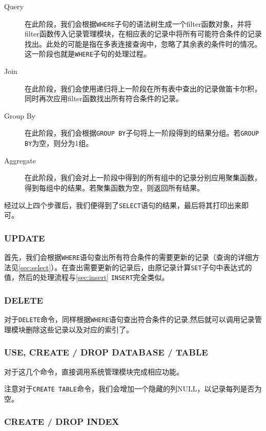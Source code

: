 \documentclass[11pt, a4paper]{article}
\begin{document}
\begin{description}
\item[Query] 在此阶段，我们会根据\texttt{WHERE}子句的语法树生成一个filter函数对象，并将filter函数传入记录管理模块，在相应表的记录中将所有可能符合条件的记录找出。此处的可能是指在多表连接查询中，忽略了其余表的条件时的情况。这一阶段也就是\texttt{WHERE}子句的处理过程。
\item[Join] 在此阶段，我们会使用递归将上一阶段在所有表中查出的记录做笛卡尔积，同时再次应用filter函数找出所有符合条件的记录。
\item[Group By] 在此阶段，我们会根据\texttt{GROUP BY}子句将上一阶段得到的结果分组。若\texttt{GROUP BY}为空，则分为1组。
\item[Aggregate] 在此阶段，我们会对上一阶段中得到的所有组中的记录分别应用聚集函数，得到每组中的结果。若聚集函数为空，则返回所有结果。
\end{description}

经过以上四个步骤后，我们便得到了\texttt{SELECT}语句的结果，最后将其打印出来即可。

\subsubsection{UPDATE}

首先，我们会根据\texttt{WHERE}语句查出所有符合条件的需要更新的记录（查询的详细方法见\ref{sec:select}）。在查出需要更新的记录后，由原记录计算\texttt{SET}子句中表达式的值，然后的处理流程与\ref{sec:insert} \texttt{INSERT}完全类似。

\subsubsection{DELETE}

对于\texttt{DELETE}命令，同样根据\texttt{WHERE}语句查出符合条件的记录,然后就可以调用记录管理模块删除这些记录以及对应的索引了。

\subsubsection{USE, CREATE / DROP DATABASE / TABLE}

对于这几个命令，直接调用系统管理模块完成相应功能。

注意对于\texttt{CREATE TABLE}命令，我们会增加一个隐藏的列NULL，以记录每列是否为空。

\subsubsection{CREATE / DROP INDEX}
\end{document}

